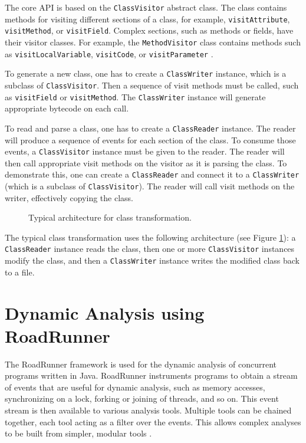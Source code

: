 The core API is based on the \texttt{ClassVisitor} abstract class. The class
contains methods for visiting different sections of a class, for example,
\texttt{visitAttribute}, \texttt{visitMethod}, or \texttt{visitField}. Complex
sections, such as methods or fields, have their visitor classes. For example,
the \texttt{MethodVisitor} class contains methods such as
\texttt{visitLocalVariable}, \texttt{visitCode}, or \texttt{visitParameter}
\cite{asmguide}.

To generate a new class, one has to create a \texttt{ClassWriter} instance,
which is a subclass of \texttt{ClassVisitor}. Then a sequence of visit methods
must be called, such as \texttt{visitField} or \texttt{visitMethod}. The
\texttt{ClassWriter} instance will generate appropriate bytecode on each call.

To read and parse a class, one has to create a \texttt{ClassReader} instance.
The reader will produce a sequence of events for each section of the class. To
consume those events, a \texttt{ClassVisitor} instance must be given to the
reader. The reader will then call appropriate visit methods on the visitor as it
is parsing the class. To demonstrate this, one can create a \texttt{ClassReader}
and connect it to a \texttt{ClassWriter} (which is a subclass of
\texttt{ClassVisitor}). The reader will call visit methods on the writer,
effectively copying the class.

\begin{figure}[hbt]
    \label{asmArchitecture}
    
    \caption{Typical architecture for class transformation.}
\end{figure}

The typical class transformation uses the following architecture (see Figure
\ref{asmArchitecture}): a \texttt{ClassReader} instance reads the class, then
one or more \texttt{ClassVisitor} instances modify the class, and then a
\texttt{ClassWriter} instance writes the modified class back to a file.

\section{Dynamic Analysis using RoadRunner}
\label{roadRunnerUsage}

The RoadRunner framework is used for the dynamic analysis of concurrent programs
written in Java. RoadRunner instruments programs to obtain a stream of events
that are useful for dynamic analysis, such as memory accesses, synchronizing on
a lock, forking or joining of threads, and so on. This event stream is then
available to various analysis tools. Multiple tools can be chained together,
each tool acting as a filter over the events. This allows complex analyses to be
built from simpler, modular tools \cite{RoadRunner}.

